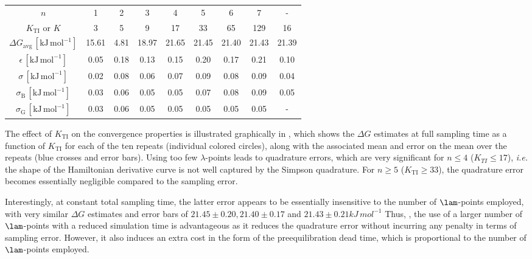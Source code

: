 \begin{table}
{\begin{tabular}{*{8}{c} | c}
\hline
   $n$ &                1 &                2 &                3 &               4 &                 5 &                6 &                7 &              - \\
   $K_{\mathrm{TI}}$ or $K$ &                3 &                5 &                9 &               17 &               33 &               65 &              129 &             16 \\
\hline
\hline
$\Delta G_{\mathrm{avg}}\,[\mathrm{kJ\,mol^{-1}}]$ &  15.61 &   4.81 &  18.97 &  21.65 &  21.45 &  21.40 &  21.43 &  21.39 \\
$\epsilon\,[\mathrm{kJ\,mol^{-1}}]$ &   0.05 &   0.18 &   0.13 &   0.15 &   0.20 &   0.17 &   0.21 &   0.10 \\
$\sigma\,[\mathrm{kJ\,mol^{-1}}]$ &   0.02 &   0.08 &   0.06 &   0.07 &   0.09 &   0.08 &   0.09 &   0.04 \\
$\sigma_{\mathrm{B}}\,[\mathrm{kJ\,mol^{-1}}]$ &   0.03 &   0.06 &   0.05 &   0.05 &   0.07 &   0.08 &   0.09 &   0.05 \\
$\sigma_{\mathrm{G}}\,[\mathrm{kJ\,mol^{-1}}]$ &   0.03 &   0.06 &   0.05 &   0.05 &   0.05 &   0.05 &   0.05  & -\\
\end{tabular}
}
\end{table}



%
The effect of $K_{\mathrm{TI}}$ on the convergence properties is 
illustrated graphically in ,
which shows the $\Delta G$ estimates at full sampling time as a function of $K_{\mathrm{TI}}$
for each of the ten repeats (individual colored circles),
along with the associated mean and error on the mean over the repeats (blue crosses and error bars).
%
Using too few $\lambda$-points leads to quadrature errors, which are very significant for $n\leq 4$ ($K_{TI} \leq 17$), 
{\em i.e.} the shape of the  Hamiltonian derivative curve is not 
well captured by the Simpson quadrature.
%
For $n \geq 5$ ($K_{\mathrm{TI}} \geq 33$), the quadrature error becomes essentially negligible
compared to the sampling error. 


Interestingly, at constant total sampling time, the latter error appears 
to be essentially insensitive to the number of $\lam$-points employed, 
with very similar $\Delta G$ estimates and error bars
of $21.45\pm 0.20, 21.40\pm 0.17$ and $21.43\pm 0.21\unit{kJ\, mol^{-1}}$ 
%
Thus, 
,
the use of a larger 
number of $\lam$-points with a reduced simulation time 
is advantageous 
as it reduces the quadrature error without incurring any penalty in terms of sampling error.
%
However, it also induces an extra cost in the form of the preequilibration dead time, which is proportional 
to the number of $\lam$-points employed. 
%
%


